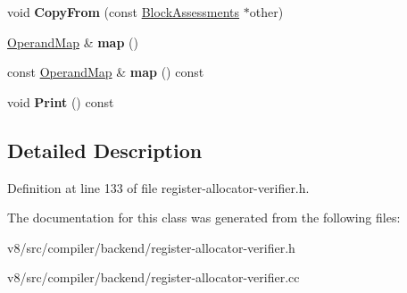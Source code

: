 \begin{DoxyCompactItemize}
void {\bfseries Copy\+From} (const \mbox{\hyperlink{classv8_1_1internal_1_1compiler_1_1BlockAssessments}{Block\+Assessments}} $\ast$other)
\item 
\mbox{\label{classv8_1_1internal_1_1compiler_1_1BlockAssessments_ac12e8c9f7acbd913d5b04639fbcc463d}} 
\mbox{\hyperlink{classv8_1_1internal_1_1ZoneMap}{Operand\+Map}} \& {\bfseries map} ()
\item 
\mbox{\label{classv8_1_1internal_1_1compiler_1_1BlockAssessments_adc9adc4a7cab49d937623b567136349f}} 
const \mbox{\hyperlink{classv8_1_1internal_1_1ZoneMap}{Operand\+Map}} \& {\bfseries map} () const
\item 
\mbox{\label{classv8_1_1internal_1_1compiler_1_1BlockAssessments_a0fb4f2daf5848423b5d54c651743fb0b}} 
void {\bfseries Print} () const
\end{DoxyCompactItemize}


\subsection{Detailed Description}


Definition at line 133 of file register-\/allocator-\/verifier.\+h.



The documentation for this class was generated from the following files\+:\begin{DoxyCompactItemize}
\item 
v8/src/compiler/backend/register-\/allocator-\/verifier.\+h\item 
v8/src/compiler/backend/register-\/allocator-\/verifier.\+cc\end{DoxyCompactItemize}
